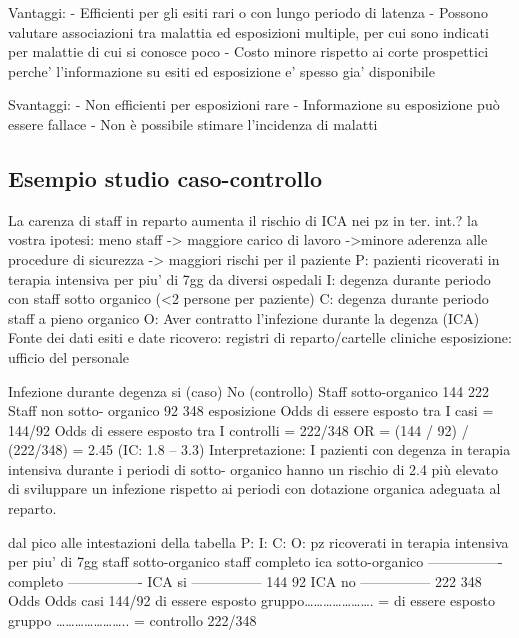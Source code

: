\documentclass[]{book}
\begin{document}
Vantaggi:
- Efficienti per gli esiti rari o con lungo periodo di latenza
- Possono valutare associazioni tra malattia ed esposizioni multiple, per cui sono
indicati per malattie di cui si conosce poco
- Costo minore rispetto ai corte prospettici perche' l'informazione su esiti ed esposizione e' spesso gia' disponibile

Svantaggi:
- Non efficienti per esposizioni rare
- Informazione su esposizione può essere fallace
- Non è possibile stimare l'incidenza di malatti

\hypertarget{esempio-studio-caso-controllo}{%
\subsection{Esempio studio caso-controllo}\label{esempio-studio-caso-controllo}}

La carenza di staff in reparto aumenta il rischio di ICA nei pz in ter. int.?
la vostra ipotesi: meno staff -\textgreater{} maggiore carico di lavoro -\textgreater{}minore aderenza alle procedure di sicurezza -\textgreater{} maggiori rischi per il paziente
P: pazienti ricoverati in terapia intensiva per piu' di 7gg da diversi ospedali
I: degenza durante periodo con staff sotto organico (\textless{}2 persone per paziente)
C: degenza durante periodo staff a pieno organico
O: Aver contratto l'infezione durante la degenza (ICA)
Fonte dei dati
esiti e date ricovero: registri di reparto/cartelle cliniche esposizione: ufficio del personale

Infezione durante degenza
si (caso)
No (controllo)
Staff sotto-organico
144
222
Staff non sotto- organico
92
348
esposizione
Odds di essere esposto tra I casi = 144/92 Odds di essere esposto tra I controlli = 222/348
OR = (144 / 92) / (222/348) = 2.45 (IC: 1.8 -- 3.3)
Interpretazione:
I pazienti con degenza in terapia intensiva durante i periodi di sotto- organico hanno un rischio di 2.4 più elevato di sviluppare un infezione rispetto ai periodi con dotazione organica adeguata al reparto.

dal pico alle intestazioni della tabella
P: I: C: O:
pz ricoverati in terapia intensiva per piu' di 7gg staff sotto-organico
staff completo
ica
sotto-organico
----------------
completo
----------------
ICA si
---------------
144
92
ICA no
---------------
222
348
Odds Odds
casi
144/92
di essere esposto gruppo\ldots{}\ldots{}\ldots{}\ldots{}\ldots{}\ldots{}\ldots{}. = di
essere esposto gruppo \ldots{}\ldots{}\ldots{}\ldots{}\ldots{}\ldots{}\ldots{}.. =
controllo
222/348
\end{document}
